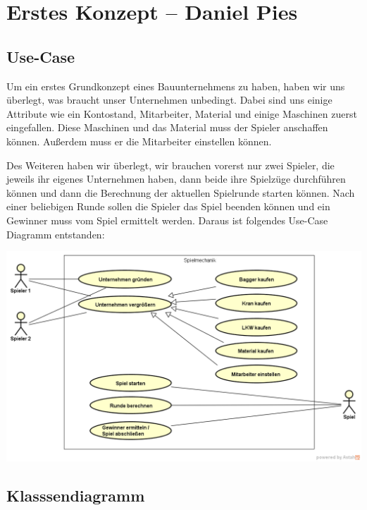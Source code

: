 \chapter{Erstes Konzept -- Daniel Pies}

\section{Use-Case}

Um ein erstes Grundkonzept eines Bauunternehmens zu haben, haben wir uns überlegt, was braucht unser Unternehmen unbedingt. Dabei sind uns einige Attribute wie ein Kontostand, Mitarbeiter, Material und einige Maschinen zuerst eingefallen. Diese Maschinen und das Material muss der Spieler anschaffen können. Außerdem muss er die Mitarbeiter einstellen können.

Des Weiteren haben wir überlegt, wir brauchen vorerst nur zwei Spieler, die jeweils ihr eigenes Unternehmen haben, dann beide ihre Spielzüge durchführen können und dann die Berechnung der aktuellen Spielrunde starten können. Nach einer beliebigen Runde sollen die Spieler das Spiel beenden können und ein Gewinner muss vom Spiel ermittelt werden. Daraus ist folgendes Use-Case Diagramm entstanden:

\begin{minipage}{\linewidth}
	\centering
	\includegraphics[scale=0.4]{img/UseCasePrototypeFallstudie.png}
	\vspace{2em}
\end{minipage}

\section{Klasssendiagramm}

